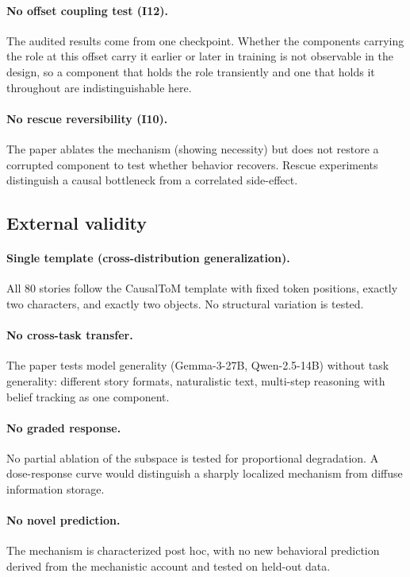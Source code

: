 \documentclass{article}
\begin{document}
\paragraph{No offset coupling test (I12).}
The audited results come from one checkpoint. Whether the components carrying the role at
this offset carry it earlier or later in training is not observable in the design, so a
component that holds the role transiently and one that holds it throughout are
indistinguishable here.

\paragraph{No rescue reversibility (I10).}
The paper ablates the mechanism (showing necessity) but does not restore a corrupted component to test whether behavior recovers. Rescue experiments distinguish a causal bottleneck from a correlated side-effect.

\subsection{External validity}

\paragraph{Single template (cross-distribution generalization).}
All 80 stories follow the CausalToM template with fixed token positions, exactly two characters, and exactly two objects. No structural variation is tested.

\paragraph{No cross-task transfer.}
The paper tests model generality (Gemma-3-27B, Qwen-2.5-14B) without task generality: different story formats, naturalistic text, multi-step reasoning with belief tracking as one component.

\paragraph{No graded response.}
No partial ablation of the subspace is tested for proportional degradation. A dose-response curve would distinguish a sharply localized mechanism from diffuse information storage.

\paragraph{No novel prediction.}
The mechanism is characterized post hoc, with no new behavioral prediction derived from the mechanistic account and tested on held-out data.
\end{document}
